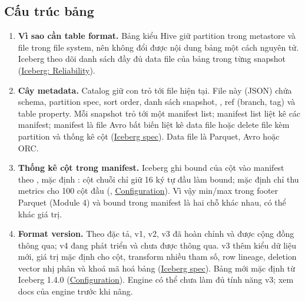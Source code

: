\subsection{Cấu trúc bảng}
\begin{enumerate}
  \item \textbf{Vì sao cần table format.} Bảng kiểu Hive giữ partition trong metastore và file trong file system, nên không đổi được nội dung bảng một cách nguyên tử. Iceberg theo dõi danh sách đầy đủ data file của bảng trong từng snapshot (\href{https://iceberg.apache.org/docs/latest/reliability/}{Iceberg: Reliability}).
  \item \textbf{Cây metadata.} Catalog giữ con trỏ tới file  hiện tại. File này (JSON) chứa schema, partition spec, sort order, danh sách snapshot, , ref (branch, tag) và table property. Mỗi snapshot trỏ tới một manifest list; manifest list liệt kê các manifest; manifest là file Avro bất biến liệt kê data file hoặc delete file kèm partition và thống kê cột (\href{https://iceberg.apache.org/spec/}{Iceberg spec}). Data file là Parquet, Avro hoặc ORC.
  \item \textbf{Thống kê cột trong manifest.} Iceberg ghi bound của cột vào manifest theo , mặc định : cột chuỗi chỉ giữ 16 ký tự đầu làm bound; mặc định chỉ thu metrics cho 100 cột đầu (, \href{https://iceberg.apache.org/docs/latest/configuration/}{Configuration}). Vì vậy min/max trong footer Parquet (Module 4) và bound trong manifest là hai chỗ khác nhau, có thể khác giá trị.
  \item \textbf{Format version.} Theo đặc tả, v1, v2, v3 đã hoàn chỉnh và được cộng đồng thông qua; v4 đang phát triển và chưa được thông qua. v3 thêm kiểu dữ liệu mới, giá trị mặc định cho cột, transform nhiều tham số, row lineage, deletion vector nhị phân và khoá mã hoá bảng (\href{https://iceberg.apache.org/spec/}{Iceberg spec}). Bảng mới mặc định  từ Iceberg 1.4.0 (\href{https://iceberg.apache.org/docs/latest/configuration/}{Configuration}). Engine có thể chưa làm đủ tính năng v3; xem docs của engine trước khi nâng.
\end{enumerate}

